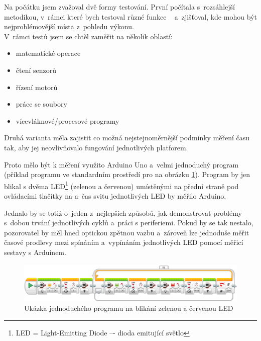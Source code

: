 Na počátku jsem zvažoval dvě formy testování. První počítala s~rozsáhlejší metodikou, v~rámci které bych testoval různé funkce \EVthree{}~ a~zjišťoval, kde mohou být nejproblémovější místa z~pohledu výkonu. \\

V~rámci testů jsem se chtěl zaměřit na několik oblastí: %

\begin{itemize}
	\item matematické operace
	\item čtení senzorů
	\item řízení motorů
	\item práce se soubory
	\item vícevláknové/procesové programy
\end{itemize}  

Druhá varianta měla zajistit co možná nejstejnoměrnější podmínky měření času tak, aby jej neovlivňovalo fungování jednotlivých platforem. 

Proto mělo být k měření využito Arduino Uno a~velmi jednoduchý program  (příklad programu ve standardním prostředí pro \EVthree{ }na obrázku \ref{fig:LoopTimeLEDblinking-measuring}).
Program by jen blikal s dvěma LED\footnote{LED = Light-Emitting Diode –- dioda emitující světlo} (zelenou a červenou) umístěnými na přední straně pod ovládacími tlačítky na  a~čas svitu jednotlivých LED by měřilo Arduino.



Jednalo by se totiž o~jeden z~nejlepších způsobů, jak demonstrovat problémy s~dobou trvání jednotlivých cyklů a~práci s periferiemi. 
Pokud by se tak nestalo, pozorovatel by měl hned optickou zpětnou vazbu a~zároveň lze jednoduše měřit časové prodlevy mezi spínáním a~vypínáním jednotlivých LED pomocí měřicí sestavy s Arduinem.


\begin{figure}[h]
	\centering
	\includegraphics[width=\textwidth]{images/measuring-ev3-software_LoopTimeLEDblinking.png}
	\caption[Ukázka jednoduchého programu na blikání zelenou a červenou LED]{Ukázka jednoduchého programu na blikání zelenou a červenou LED}
	\label{fig:LoopTimeLEDblinking-measuring}
\end{figure}

